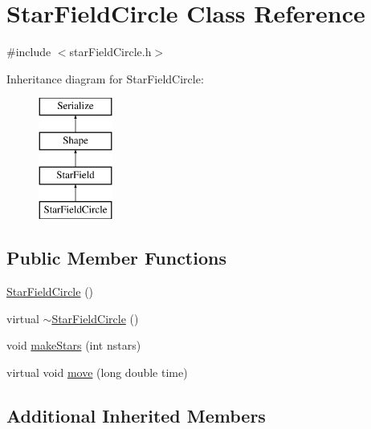 \hypertarget{classStarFieldCircle}{\section{Star\-Field\-Circle Class Reference}
\label{classStarFieldCircle}
}


{\ttfamily \#include $<$star\-Field\-Circle.\-h$>$}

Inheritance diagram for Star\-Field\-Circle\-:\begin{figure}[H]
\begin{center}
\leavevmode
\includegraphics[height=4.000000cm]{classStarFieldCircle}
\end{center}
\end{figure}
\subsection*{Public Member Functions}
\begin{DoxyCompactItemize}
\item 
\hyperlink{classStarFieldCircle_a4b94a3f6c1c21271051f9bf3f8b42304}{Star\-Field\-Circle} ()
\item 
virtual \hyperlink{classStarFieldCircle_afea7e1add134916448c7bef6447e5f99}{$\sim$\-Star\-Field\-Circle} ()
\item 
void \hyperlink{classStarFieldCircle_af5d514f70b06701697786a9d7b09607c}{make\-Stars} (int nstars)
\item 
virtual void \hyperlink{classStarFieldCircle_af54e17032bb1ee195137b3585e7caea5}{move} (long double time)
\end{DoxyCompactItemize}
\subsection*{Additional Inherited Members}


